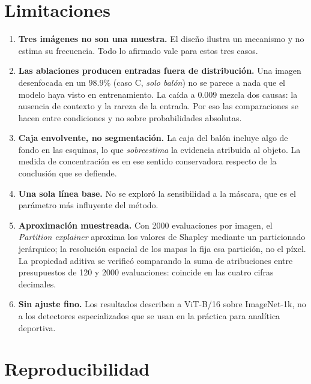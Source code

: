 \documentclass[11pt]{article}
\begin{document}
\section{Limitaciones}

\begin{enumerate}
  \item \textbf{Tres imágenes no son una muestra.} El diseño ilustra un mecanismo y no
        estima su frecuencia. Todo lo afirmado vale para estos tres casos.

  \item \textbf{Las ablaciones producen entradas fuera de distribución.} Una imagen
        desenfocada en un $98.9\%$ (caso C, \emph{solo balón}) no se parece a nada que
        el modelo haya visto en entrenamiento. La caída a $0.009$ mezcla dos causas:
        la ausencia de contexto y la rareza de la entrada. Por eso las comparaciones se
        hacen entre condiciones y no sobre probabilidades absolutas.

  \item \textbf{Caja envolvente, no segmentación.} La caja del balón incluye algo de
        fondo en las esquinas, lo que \emph{sobreestima} la evidencia atribuida al
        objeto. La medida de concentración es en ese sentido conservadora respecto de
        la conclusión que se defiende.

  \item \textbf{Una sola línea base.} No se exploró la sensibilidad a la máscara, que
        es el parámetro más influyente del método.

  \item \textbf{Aproximación muestreada.} Con 2000 evaluaciones por imagen, el
        \emph{Partition explainer} aproxima los valores de Shapley mediante un
        particionado jerárquico; la resolución espacial de los mapas la fija esa
        partición, no el píxel. La propiedad aditiva se verificó comparando la suma de
        atribuciones entre presupuestos de 120 y 2000 evaluaciones: coincide en las
        cuatro cifras decimales.

  \item \textbf{Sin ajuste fino.} Los resultados describen a ViT-B/16 sobre
        ImageNet-1k, no a los detectores especializados que se usan en la práctica
        para analítica deportiva.
\end{enumerate}

\section{Reproducibilidad}
\end{document}
